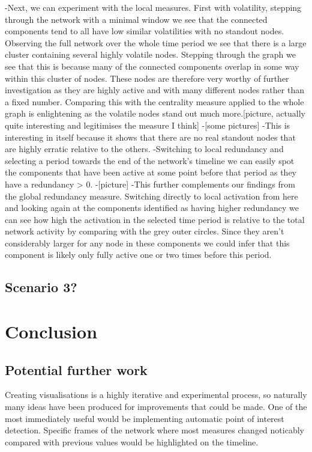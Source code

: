     -Next, we can experiment with the local measures. First with volatility, stepping through the network with a minimal window we see that the connected components tend to all have low similar volatilities with no standout nodes. Observing the full network over the whole time period we see that there is a large cluster containing several highly volatile nodes. Stepping through the graph we see that this is because many of the connected components overlap in some way within this cluster of nodes. These nodes are therefore very worthy of further investigation as they are highly active and with many different nodes rather than a fixed number.
    Comparing this with the centrality measure applied to the whole graph is enlightening as the volatile nodes stand out much more.[picture, actually quite interesting and legitimises the measure I think]
    -[some pictures]
    -This is interesting in itself because it shows that there are no real standout nodes that are highly erratic relative to the others.
    -Switching to local redundancy and selecting a period towards the end of the network's timeline we can easily spot the components that have been active at some point before that period as they have a redundancy > 0.
    -[picture]
    -This further complements our findings from the global redundancy measure. Switching directly to local activation from here and looking again at the components identified as having higher redundancy we can see how high the activation in the selected time period is relative to the total network activity by comparing with the grey outer circles. Since they aren't considerably larger for any node in these components we could infer that this component is likely only fully active one or two times before this period.

\section{Scenario 3?} 


\chapter{Conclusion}

\section{Potential further work} 
Creating visualisations is a highly iterative and experimental process, so naturally many ideas have been produced for improvements that could be made. 
One of the most immediately useful would be implementing automatic point of interest detection. Specific frames of the network where most measures changed noticably compared with previous values would be highlighted on the timeline.
\newline

